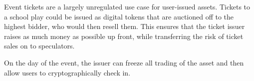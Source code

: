 Event tickets are a largely unregulated use case for user-issued assets.
Tickets to a school play could be issued as digital tokens that are auctioned
off to the highest bidder, who would then resell them. This ensures that the
ticket issuer raises as much money as possible up front, while transferring the
risk of ticket sales on to speculators.

On the day of the event, the issuer can freeze all trading of the asset and
then allow users to cryptographically check in.
